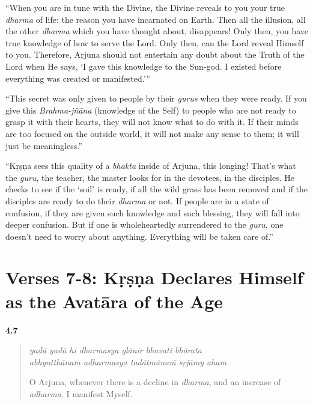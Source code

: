 \enquote{When you are in tune with the Divine, the Divine reveals to you your true \textit{dharma} of life: the reason you have incarnated on Earth. Then all the illusion, all the other \textit{dharma} which you have thought about, disappears! Only then, you have true knowledge of how to serve the Lord. Only then, can the Lord reveal Himself to you. Therefore, Arjuna should not entertain any doubt about the Truth of the Lord when He says, \enquote{I gave this knowledge to the Sun-god. I existed before everything was created or manifested.}}

\enquote{This secret was only given to people by their \textit{gurus} when they were ready. If you give this \textit{Brahma-jñāna} (knowledge of the Self) to people who are not ready to grasp it with their hearts, they will not know what to do with it. If their minds are too focused on the outside world, it will not make any sense to them; it will just be meaningless.}

\enquote{Kṛṣṇa sees this quality of a \textit{bhakta} inside of Arjuna, this longing! That’s what the \textit{guru}, the teacher, the master looks for in the devotees, in the disciples. He checks to see if the \enquote{soil} is ready, if all the wild grass has been removed and if the disciples are ready to do their \textit{dharma} or not. If people are in a state of confusion, if they are given such knowledge and such blessing, they will fall into deeper confusion. But if one is wholeheartedly surrendered to the \textit{guru}, one doesn’t need to worry about anything. Everything will be taken care of.}

\section{Verses 7-8: Kṛṣṇa Declares Himself as the Avatāra of the Age}\label{sec-verses-7-8-krsna-declares-himself-as-the-avatara-of-the-age}


\par\noindent\textbf{4.7}\par
\begin{verse}
\textit{yadā yadā hi dharmasya glānir bhavati bhārata} \\
\textit{abhyutthānam adharmasya tadātmānaṁ sṛjāmy aham}

\noindent O Arjuna, whenever there is a decline in \textit{dharma}, and an increase of \textit{adharma}, I manifest Myself.
\end{verse}
\par



